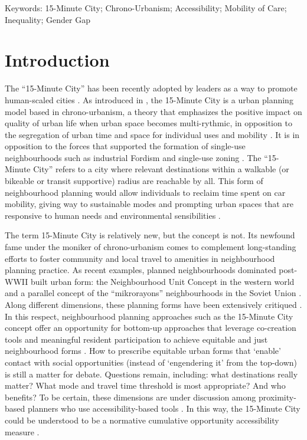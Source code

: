 \documentclass[
  authoryear,
  preprint,
  3p]{elsarticle}
\begin{document}
Keywords: 15-Minute City; Chrono-Urbanism; Accessibility; Mobility of
Care; Inequality; Gender Gap

\section{Introduction}\label{introduction}

The ``15-Minute City'' has been recently adopted by leaders as a way to
promote human-scaled cities
\citep{teixeiraClassifying15minuteCities2024}. As introduced in
\citet{moreno_introducing_2021}, the 15-Minute City is a urban planning
model based in chrono-urbanism, a theory that emphasizes the positive
impact on quality of urban life when urban space becomes multi-rythmic,
in opposition to the segregation of urban time and space for individual
uses and mobility
\citep{mulicekUrbanRhythmsChronotopic2015, morenoVilleQuartHeure2016}.
It is in opposition to the forces that supported the formation of
single-use neighbourhoods such as industrial Fordism and single-use
zoning
\citep{mulicekUrbanRhythmsChronotopic2015, morenoVilleQuartHeure2016}.
The ``15-Minute City'' refers to a city where relevant destinations
within a walkable (or bikeable or transit supportive) radius are
reachable by all. This form of neighbourhood planning would allow
individuals to reclaim time spent on car mobility, giving way to
sustainable modes and prompting urban spaces that are responsive to
human needs and environmental sensibilities \citep{Allam2022}.

The term 15-Minute City is relatively new, but the concept is not. Its
newfound fame under the moniker of chrono-urbanism comes to complement
long-standing efforts to foster community and local travel to amenities
in neighbourhood planning practice. As recent examples, planned
neighbourhoods dominated post-WWII built urban form: the Neighbourhood
Unit Concept in the western world
\citep{brodyNeighbourhoodUnitConcept2013} and a parallel concept of the
``mikrorayons'' neighbourhoods in the Soviet Union
\citep{kissfazekasCircleParadigms15minute2022}. Along different
dimensions, these planning forms have been extensively critiqued
\citep{talenSocialSciencePlanned2017}. In this respect, neighbourhood
planning approaches such as the 15-Minute City concept offer an
opportunity for bottom-up approaches that leverage co-creation tools and
meaningful resident participation to achieve equitable and just
neighbourhood forms \citep{mahmoudCocreationPathwayUrban2021}. How to
prescribe equitable urban forms that `enable' contact with social
opportunities (instead of `engendering it' from the top-down) is still a
matter for debate. Questions remain, including: what destinations really
matter? What mode and travel time threshold is most appropriate? And who
benefits? To be certain, these dimensions are under discussion among
proximity-based planners who use accessibility-based tools
\citep{silvaProximitycentredAccessibilityConceptual2023, silvaRegionalAccessibilityUndermining2022, guzmanProximityEnoughCritical2024}.
In this way, the 15-Minute City could be understood to be a normative
cumulative opportunity accessibility measure
\citep{paez_measuring_2012}.
\end{document}
